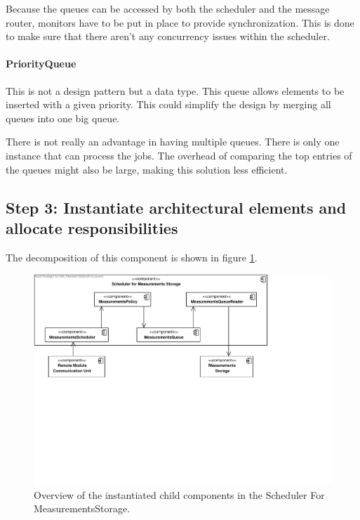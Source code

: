 \npar Because the queues can be accessed by both the scheduler and the message
router, monitors have to be put in place to provide synchronization. This is
done to make sure that there aren't any concurrency issues within the scheduler. 

\paragraph{PriorityQueue}

\npar This is not a design pattern but a data type. This queue allows elements
to be inserted with a given priority. This could simplify the design by merging
all queues into one big queue.

\npar There is not really an advantage in having multiple queues. There is only
one instance that can process the jobs. The overhead of comparing the top
entries of the queues might also be large, making this solution less efficient. 

\subsection{Step 3: Instantiate architectural elements and allocate responsibilities}
\label{add:it3/elements}

\npar The decomposition of this component is shown in figure
\ref{fig:it3/elements}. 

\begin{figure}[H]
	\begin{centering}
		\includegraphics[width=\textwidth]{figs/add-it3-elements.pdf}
		\caption{Overview of the instantiated child components in the Scheduler For
		MeasurementsStorage.}
		\label{fig:it3/elements}
	\end{centering}
\end{figure}

